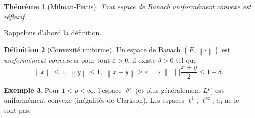 \documentclass[a4paper,12pt]{book}
\newcommand{\norm}[1]{\left\| #1 \right\|}
\theoremstyle{definition}
\newtheorem{definition}{Définition}[chapter]
\newtheorem{exemple}[definition]{Exemple}
\theoremstyle{plain}
\newtheorem{theoreme}[definition]{Théorème}
\theoremstyle{remark}
\begin{document}
\begin{theoreme}[Milman-Pettis]
\label{thm:milman-pettis}
Tout espace de Banach uniformément convexe est réflexif.
\end{theoreme}

Rappelons d'abord la définition.

\begin{definition}[Convexité uniforme]
\label{def:unif-convexe}
Un espace de Banach $(E, \norm{\cdot})$ est \emph{uniformément convexe} si pour tout
$\varepsilon > 0$, il existe $\delta > 0$ tel que
\[
  \norm{x} \le 1, \; \norm{y} \le 1, \; \norm{x - y} \ge \varepsilon
  \implies \norm[\bigg]{\frac{x+y}{2}} \le 1 - \delta.
\]
\end{definition}

\begin{exemple}
\label{ex:lp-unif-convexe}
Pour $1 < p < \infty$, l'espace $\ell^p$ (et plus généralement $L^p$) est
uniformément convexe (inégalités de Clarkson).
Les espaces $\ell^1$, $\ell^\infty$, $c_0$ ne le sont pas.
\end{exemple}
\end{document}
